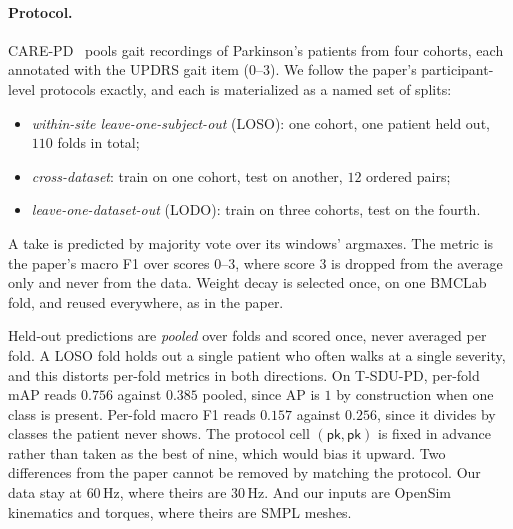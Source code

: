 \paragraph{Protocol.} CARE-PD~\cite{adeli2025carepd} pools gait recordings of Parkinson's
patients from four cohorts, each annotated with the UPDRS gait item ($0$--$3$). We follow
the paper's participant-level protocols exactly, and each is materialized as a named set of
splits:
\begin{itemize}
\item \emph{within-site leave-one-subject-out} (LOSO): one cohort, one patient held out,
  $110$ folds in total;
\item \emph{cross-dataset}: train on one cohort, test on another, $12$ ordered pairs;
\item \emph{leave-one-dataset-out} (LODO): train on three cohorts, test on the fourth.
\end{itemize}
A take is predicted by majority vote over its windows' argmaxes. The metric is the paper's
macro F1 over scores $0$--$3$, where score $3$ is dropped from the average only and never
from the data. Weight decay is selected once, on one BMCLab fold, and reused everywhere, as
in the paper.

Held-out predictions are \emph{pooled} over folds and scored once, never averaged per fold.
A LOSO fold holds out a single patient who often walks at a single severity, and this
distorts per-fold metrics in both directions. On T-SDU-PD, per-fold mAP reads $0.756$
against $0.385$ pooled, since AP is $1$ by construction when one class is present. Per-fold
macro F1 reads $0.157$ against $0.256$, since it divides by classes the patient never shows.
The protocol cell $(\textsf{pk},\textsf{pk})$ is fixed in advance rather than taken as the
best of nine, which would bias it upward. Two differences from the paper cannot be removed
by matching the protocol. Our data stay at $60$\,Hz, where theirs are $30$\,Hz. And our
inputs are OpenSim kinematics and torques, where theirs are SMPL meshes.

